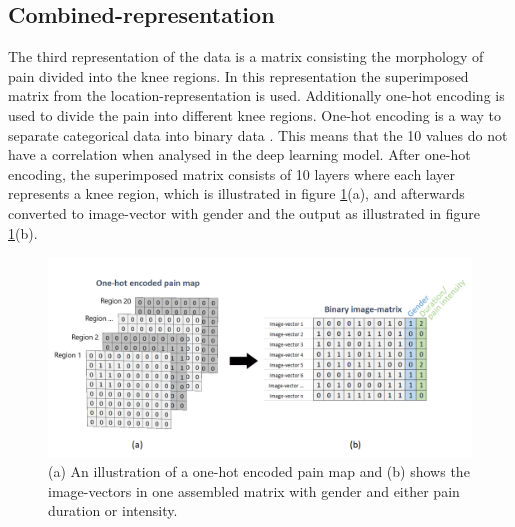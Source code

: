 \subsection{Combined-representation} \label{sec:combined}
The third representation of the data is a matrix consisting the morphology of pain divided into the knee regions.
\noindent
In this representation the superimposed matrix from the location-representation is used. Additionally one-hot encoding is used to divide the pain into different knee regions. One-hot encoding is a way to separate categorical data into binary data \citep{Harris2012}. This means that the 10 values do not have a correlation when analysed in the deep learning model. After one-hot encoding, the superimposed matrix consists of 10 layers where each layer represents a knee region, which is illustrated in figure \ref{fig:onehot}(a), and afterwards converted to image-vector with gender and the output as illustrated in figure \ref{fig:onehot}(b).

\begin{figure} [H]
\centering
\includegraphics[width=1\textwidth]{figures/onehotmatrix}
\caption{(a) An illustration of a one-hot encoded pain map and (b) shows the image-vectors in one assembled matrix with gender and either pain duration or intensity.}
\label{fig:onehot}
\end{figure}
